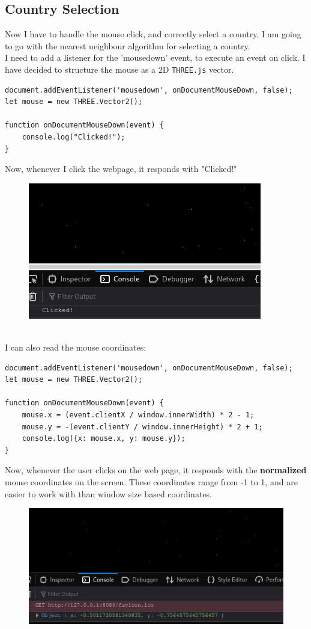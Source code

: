 \subsection{Country Selection}
Now I have to handle the mouse click, and correctly select a country. I am going to go with the nearest neighbour algorithm for selecting a country. \\
I need to add a listener for the 'mousedown' event, to execute an event on click. I have decided to structure the mouse as a 2D \verb|THREE.js| vector.
\begin{lstlisting}
document.addEventListener('mousedown', onDocumentMouseDown, false);
let mouse = new THREE.Vector2();

function onDocumentMouseDown(event) {
    console.log("Clicked!");
}
\end{lstlisting}
Now, whenever I click the webpage, it responds with "Clicked!"
\begin{figure}[h]
\centering
\includegraphics[width=0.6\linewidth]{images/clicked}
\caption{}
\label{fig:clicked}
\end{figure}
\\ I can also read the mouse coordinates:
\begin{lstlisting}
document.addEventListener('mousedown', onDocumentMouseDown, false);
let mouse = new THREE.Vector2();

function onDocumentMouseDown(event) {
    mouse.x = (event.clientX / window.innerWidth) * 2 - 1;
    mouse.y = -(event.clientY / window.innerHeight) * 2 + 1;
    console.log({x: mouse.x, y: mouse.y});
}
\end{lstlisting}
Now, whenever the user clicks on the web page, it responds with the \textbf{normalized} mouse coordinates on the screen. These coordinates range from -1 to 1, and are easier to work with than window size based coordinates.
\begin{figure}[ht]
\centering
\includegraphics[width=0.7\linewidth]{images/coords}
\caption{}
\label{fig:coords}
\end{figure}
